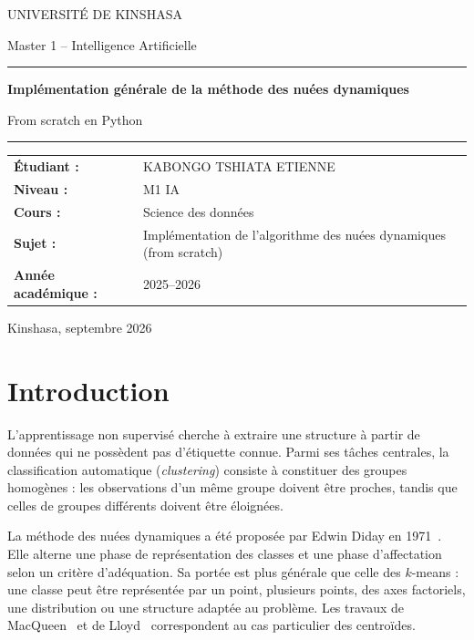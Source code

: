 \documentclass[12pt,a4paper]{article}
\begin{document}
\begin{titlepage}
  \centering
  {\large UNIVERSITÉ DE KINSHASA\par}
  \vspace{0.4cm}
  {\large Master 1 -- Intelligence Artificielle\par}
  \vfill
  {\color{bleu}\rule{\textwidth}{1.4pt}\par}
  \vspace{0.5cm}
  {\Huge\bfseries Implémentation générale de la méthode des nuées dynamiques\par}
  \vspace{0.35cm}
  {\LARGE From scratch en Python\par}
  \vspace{0.5cm}
  {\color{bleu}\rule{\textwidth}{1.4pt}\par}
  \vfill
  \begin{tabular}{>{\bfseries}p{4.2cm}p{8cm}}
    Étudiant : & KABONGO TSHIATA ETIENNE\\
    Niveau : & M1 IA\\
    Cours : & Science des données\\
    Sujet : & Implémentation de l'algorithme des nuées dynamiques (from scratch)\\
    Année académique : & 2025--2026
  \end{tabular}
  \vfill
  {\large Kinshasa, septembre 2026\par}
\end{titlepage}

\tableofcontents
\newpage

\section{Introduction}
L'apprentissage non supervisé cherche à extraire une structure à partir de
données qui ne possèdent pas d'étiquette connue. Parmi ses tâches centrales,
la classification automatique (\emph{clustering}) consiste à constituer des
groupes homogènes : les observations d'un même groupe doivent être proches,
tandis que celles de groupes différents doivent être éloignées.

La méthode des nuées dynamiques a été proposée par Edwin Diday en
1971~\cite{diday1971}. Elle alterne une phase de représentation des classes et
une phase d'affectation selon un critère d'adéquation. Sa portée est plus
générale que celle des $k$-means : une classe peut être représentée par un
point, plusieurs points, des axes factoriels, une distribution ou une structure
adaptée au problème. Les travaux de MacQueen~\cite{macqueen1967} et de
Lloyd~\cite{lloyd1982} correspondent au cas particulier des centroïdes.
\end{document}
